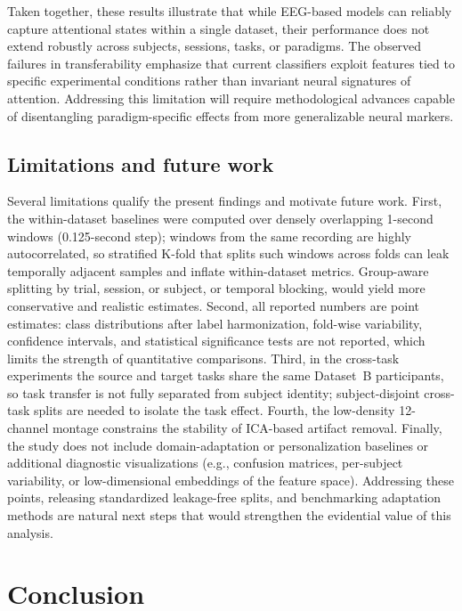 \documentclass[10pt,letterpaper]{article}
\newcommand{\rev}[1]{#1} %
\newcommand{\revs}[1]{#1} %
\begin{document}
Taken together, these results illustrate that while EEG-based models can reliably capture attentional states within a single dataset, their performance does not extend robustly across subjects, sessions, tasks, or paradigms. The observed failures in transferability emphasize that current classifiers exploit features tied to specific experimental conditions rather than invariant neural signatures of attention. Addressing this limitation will require methodological advances capable of disentangling paradigm-specific effects from more generalizable neural markers.

\subsection*{\revs{Limitations and future work}}

\rev{Several limitations qualify the present findings and motivate future work. First, the within-dataset baselines were computed over densely overlapping 1-second windows (0.125-second step); windows from the same recording are highly autocorrelated, so stratified K-fold that splits such windows across folds can leak temporally adjacent samples and inflate within-dataset metrics. Group-aware splitting by trial, session, or subject, or temporal blocking, would yield more conservative and realistic estimates. Second, all reported numbers are point estimates: class distributions after label harmonization, fold-wise variability, confidence intervals, and statistical significance tests are not reported, which limits the strength of quantitative comparisons. Third, in the cross-task experiments the source and target tasks share the same Dataset~B participants, so task transfer is not fully separated from subject identity; subject-disjoint cross-task splits are needed to isolate the task effect. Fourth, the low-density 12-channel montage constrains the stability of ICA-based artifact removal. Finally, the study does not include domain-adaptation or personalization baselines or additional diagnostic visualizations (e.g., confusion matrices, per-subject variability, or low-dimensional embeddings of the feature space). Addressing these points, releasing standardized leakage-free splits, and benchmarking adaptation methods are natural next steps that would strengthen the evidential value of this analysis.}

\section*{Conclusion}
\end{document}
